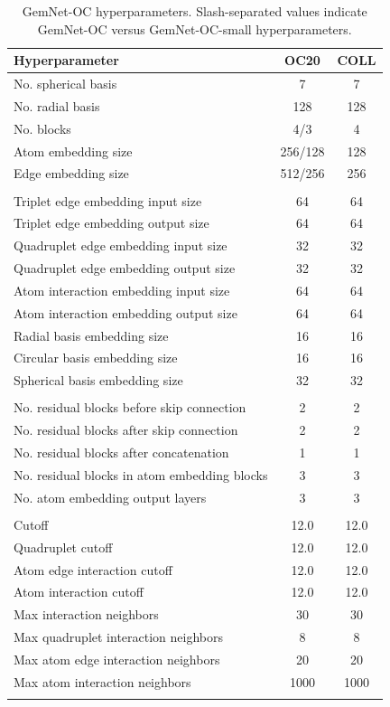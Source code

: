 \documentclass{article}
\begin{document}
\begin{table}[H]
\centering
\caption{GemNet-OC hyperparameters. Slash-separated values indicate GemNet-OC versus GemNet-OC-small hyperparameters.}
\label{tab:GemNet_hypers}
\begin{tabular}{lcc}
Hyperparameter & OC20 & COLL\\\hline
No. spherical basis & 7 & 7 \\
No. radial basis & 128 & 128\\
No. blocks & 4/3 & 4\\
Atom embedding size & 256/128 & 128 \\
Edge embedding size & 512/256 & 256 \\\\

Triplet edge embedding input size & 64 & 64\\
Triplet edge embedding output size & 64 & 64\\
Quadruplet edge embedding input size & 32 & 32\\
Quadruplet edge embedding output size & 32 & 32\\
Atom interaction embedding input size & 64 & 64\\
Atom interaction embedding output size & 64 & 64\\
Radial basis embedding size & 16 & 16\\
Circular basis embedding size & 16 & 16  \\
Spherical basis embedding size & 32 & 32 \\\\

No. residual blocks before skip connection & 2 & 2\\
No. residual blocks after skip connection & 2 & 2\\
No. residual blocks after concatenation & 1 & 1 \\
No. residual blocks in atom embedding blocks & 3 & 3 \\
No. atom embedding output layers & 3 & 3 \\\\

Cutoff & 12.0 & 12.0\\
Quadruplet cutoff & 12.0 &  12.0\\
Atom edge interaction cutoff &  12.0 & 12.0 \\
Atom interaction cutoff & 12.0 & 12.0 \\
Max interaction neighbors & 30 & 30\\
Max quadruplet interaction neighbors & 8 & 8 \\
Max atom edge interaction neighbors & 20 & 20\\
Max atom interaction neighbors & 1000 & 1000\\\\


\end{tabular}
\end{table}
\end{document}
